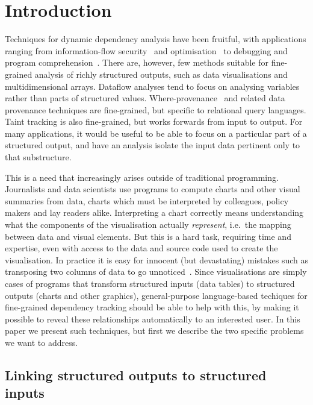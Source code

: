 \section{Introduction}
\label{sec:introduction}

Techniques for dynamic dependency analysis have been fruitful, with applications ranging from information-flow security~\cite{sabelfeld03} and optimisation~\cite{kildall73} to debugging and program comprehension~\cite{weiser81,delucia96}. There are, however, few methods suitable for fine-grained analysis of richly structured outputs, such as data visualisations and multidimensional arrays. Dataflow analyses \cite{reps95} tend to focus on analysing variables rather than parts of structured values. Where-provenance~\cite{buneman01} and related data provenance techniques are fine-grained, but specific to relational query languages. Taint tracking \cite{newsome05} is also fine-grained, but works forwards from input to output. For many applications, it would be useful to be able to focus on a particular part of a structured output, and have an analysis isolate the input data pertinent only to that substructure.

This is a need that increasingly arises outside of traditional programming. Journalists and data scientists use programs to compute charts and other visual summaries from data, charts which must be interpreted by colleagues, policy makers and lay readers alike. Interpreting a chart correctly means understanding what the components of the visualisation actually \emph{represent}, i.e.~the mapping between data and visual elements. But this is a hard task, requiring time and expertise, even with access to the data and source code used to create the visualisation. In practice it is easy for innocent (but devastating) mistakes such as transposing two columns of data to go unnoticed~\cite{miller06}. Since visualisations are simply cases of programs that transform structured inputs (data tables) to structured outputs (charts and other graphics), general-purpose language-based techiques for fine-grained dependency tracking should be able to help with this, by making it possible to reveal these relationships automatically to an interested user. In this paper we present such techniques, but first we describe the two specific problems we want to address.

\subsection{Linking structured outputs to structured inputs}
\label{sec:introduction:data-linking}

